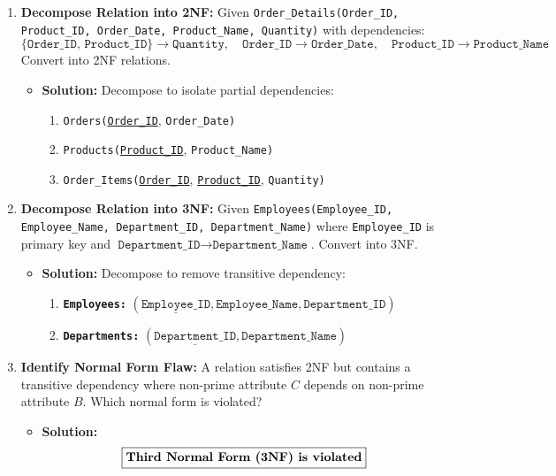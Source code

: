 \begin{enumerate}[label=\textbf{Problem \arabic*.,resume},leftmargin=1.5cm]
\item \textbf{Decompose Relation into 2NF:}
Given \texttt{Order\_Details(Order\_ID, Product\_ID, Order\_Date, Product\_Name, Quantity)} with dependencies:
\[ \{\texttt{Order\_ID, Product\_ID}\} \rightarrow \texttt{Quantity}, \quad \texttt{Order\_ID} \rightarrow \texttt{Order\_Date}, \quad \texttt{Product\_ID} \rightarrow \texttt{Product\_Name} \]
Convert into 2NF relations.
\begin{itemize}
\item \textbf{Solution:}
Decompose to isolate partial dependencies:
\begin{enumerate}
\item \texttt{Orders(}\underline{\texttt{Order\_ID}}, \texttt{Order\_Date)}
\item \texttt{Products(}\underline{\texttt{Product\_ID}}, \texttt{Product\_Name)}
\item \texttt{Order\_Items(}\underline{\texttt{Order\_ID}}, \underline{\texttt{Product\_ID}}, \texttt{Quantity)}
\end{enumerate}
\end{itemize}

\item \textbf{Decompose Relation into 3NF:}
Given \texttt{Employees(Employee\_ID, Employee\_Name, Department\_ID, Department\_Name)} where \texttt{Employee\_ID} is primary key and $\texttt{Department\_ID} \rightarrow \texttt{Department\_Name}$. Convert into 3NF.
\begin{itemize}
\item \textbf{Solution:}
Decompose to remove transitive dependency:
\begin{enumerate}
\item \textbf{\texttt{Employees:}} $(\underline{\texttt{Employee\_ID}}, \texttt{Employee\_Name}, \texttt{Department\_ID})$
\item \textbf{\texttt{Departments:}} $(\underline{\texttt{Department\_ID}}, \texttt{Department\_Name})$
\end{enumerate}
\end{itemize}

\item \textbf{Identify Normal Form Flaw:}
A relation satisfies 2NF but contains a transitive dependency where non-prime attribute $C$ depends on non-prime attribute $B$. Which normal form is violated?
\begin{itemize}
\item \textbf{Solution:}
\[ \boxed{\text{\textbf{Third Normal Form (3NF) is violated}}} \]
\end{itemize}


\end{enumerate}
